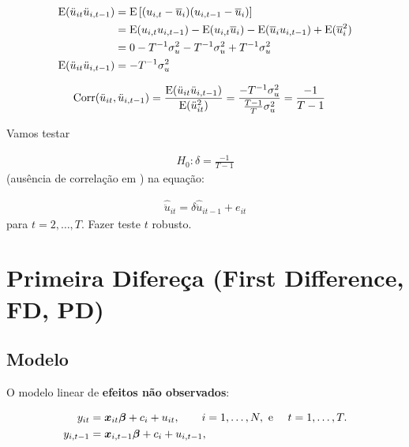 \documentclass[11pt, oneside, a4paper, article]{article}
\numberwithin{equation}{section}
\begin{document}
\vspace{-1 em} 
\begin{align*}
	\text{E}( \ddot{u}_{it} \ddot{u}_{i,t-1} ) &=
	\text{E}\left[ ( u_{i,t} - \overline{u}_{i} ) ( u_{i,t-1} - \overline{u}_{i} ) \right]
	\\
	&=
	\text{E}( u_{i,t} u_{i,t-1} ) - 
	\text{E}( u_{i,t} \overline{u}_{i} ) -
	\text{E}( \overline{u}_{i} u_{i,t-1} ) +
	\text{E}( \overline{u}^2_{i} )
	\\
	&=
	0 - T^{-1} \sigma^2_{u} - T^{-1} \sigma^2_{u} + T^{-1} \sigma^2_{u}
	\\
	\text{E}( \ddot{u}_{it} \ddot{u}_{i,t-1} ) 
	&= -T^{-1} \sigma_{u}^2
\end{align*}

\vspace{-1 em} 
\begin{align*}
	\text{Corr}( \ddot{u}_{it}, \ddot{u}_{i,t-1} ) &=
	\frac{\text{E}( \ddot{u}_{it} \ddot{u}_{i,t-1} )}{\text{E}( \ddot{u}_{it}^2 )} =
	\frac{-T^{-1} \sigma_{u}^2}{\frac{T-1}{T}\sigma^2_{u}} = 
	\frac{-1}{T-1}
\end{align*}

Vamos testar 

\vspace{-1 em} 
\begin{align*}
	H_{0}: \delta = \frac{-1}{T-1}
\end{align*}
(ausência de correlação em \red{$\uvec$}) na equação:

\vspace{-1 em} 
\begin{align*}
	\widehat{\ddot{u}}_{it} = \delta \widehat{\ddot{u}}_{it-1} + e_{it}
\end{align*}
para $t=2, \dots, T$.
Fazer teste $t$ robusto.

\clearpage
\section{Primeira Difereça (First Difference, FD, PD)}
\noindent
\citet[Sec.10.6 -- First Difference Methods, p.279]{wool-2010}

\subsection{Modelo}

O modelo linear de \textbf{efeitos não observados}:

\vspace{-1 em}
\begin{align} \label{fd:mod:1}
y_{it} &= \boldsymbol{x}_{it} \boldsymbol{\beta} + c_{i} + u_{it},
\qquad i = 1, \dots, N, \text{ e } \quad t = 1, \dots, T.
\\
\notag
y_{i,t-1} &= \boldsymbol{x}_{i,t-1} \boldsymbol{\beta} + c_{i} + u_{i,t-1},
\end{align}
\end{document}

